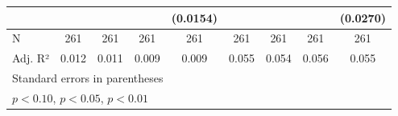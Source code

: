 {\begin{tabular}{l*{8}{c}}
                    &                     &                     &                     &    (0.0154)         &                     &                     &                     &    (0.0270)         \\
\hline
N                   &         261         &         261         &         261         &         261         &         261         &         261         &         261         &         261         \\
Adj. R²             &       0.012         &       0.011         &       0.009         &       0.009         &       0.055         &       0.054         &       0.056         &       0.055         \\
\hline\hline
\multicolumn{9}{l}{\footnotesize Standard errors in parentheses}\\
\multicolumn{9}{l}{\footnotesize \sym{*} \(p<0.10\), \sym{**} \(p<0.05\), \sym{***} \(p<0.01\)}\\
\end{tabular}
}
